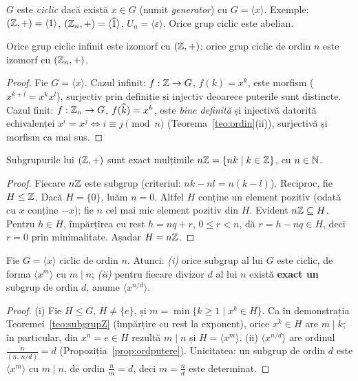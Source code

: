 \begin{definitie}
$G$ este \emph{ciclic} dacă există $x\in G$ (numit \emph{generator}) cu $G=\langle x\rangle$. Exemple: $(\mathbb{Z},+)=\langle 1\rangle$, $(\mathbb{Z}_n,+)=\langle\widehat{1}\rangle$, $U_n=\langle\varepsilon\rangle$. Orice grup ciclic este abelian.
\end{definitie}

\begin{teorema}\label{teo:clasif}
Orice grup ciclic infinit este izomorf cu $(\mathbb{Z},+)$; orice grup ciclic de ordin $n$ este izomorf cu $(\mathbb{Z}_n,+)$.
\end{teorema}

\begin{proof}
Fie $G=\langle x\rangle$. Cazul infinit: $f:\mathbb{Z}\to G$, $f(k)=x^k$, este morfism ($x^{k+l}=x^kx^l$), surjectiv prin definiție și injectiv deoarece puterile sunt distincte. Cazul finit: $f:\mathbb{Z}_n\to G$, $f(\widehat{k})=x^k$, este \emph{bine definită} și injectivă datorită echivalenței $x^i=x^j\iff i\equiv j\pmod n$ (Teorema~\ref{teo:ordin}(ii)), surjectivă și morfism ca mai sus.
\end{proof}

\begin{teorema}\label{teo:subgrupZ}
Subgrupurile lui $(\mathbb{Z},+)$ sunt exact mulțimile $n\mathbb{Z}=\{nk\mid k\in\mathbb{Z}\}$, cu $n\in\mathbb{N}$.
\end{teorema}

\begin{proof}
Fiecare $n\mathbb{Z}$ este subgrup (criteriul: $nk-nl=n(k-l)$). Reciproc, fie $H\le\mathbb{Z}$. Dacă $H=\{0\}$, luăm $n=0$. Altfel $H$ conține un element pozitiv (odată cu $x$ conține $-x$); fie $n$ cel mai mic element pozitiv din $H$. Evident $n\mathbb{Z}\subseteq H$. Pentru $h\in H$, împărțirea cu rest $h=nq+r$, $0\le r<n$, dă $r=h-nq\in H$, deci $r=0$ prin minimalitate. Așadar $H=n\mathbb{Z}$.
\end{proof}

\begin{teorema}\label{teo:subgrupciclic}
Fie $G=\langle x\rangle$ ciclic de ordin $n$. Atunci: \emph{(i)} orice subgrup al lui $G$ este ciclic, de forma $\langle x^m\rangle$ cu $m\mid n$; \emph{(ii)} pentru fiecare divizor $d$ al lui $n$ există \textbf{exact un} subgrup de ordin $d$, anume $\langle x^{n/d}\rangle$.
\end{teorema}

\begin{proof}
(i) Fie $H\le G$, $H\neq\{e\}$, și $m=\min\{k\ge 1\mid x^k\in H\}$. Ca în demonstrația Teoremei~\ref{teo:subgrupZ} (împărțire cu rest la exponent), orice $x^k\in H$ are $m\mid k$; în particular, din $x^n=e\in H$ rezultă $m\mid n$ și $H=\langle x^m\rangle$. (ii) $\langle x^{n/d}\rangle$ are ordinul $\frac{n}{(n,\,n/d)}=d$ (Propoziția~\ref{prop:ordputere}). Unicitatea: un subgrup de ordin $d$ este $\langle x^m\rangle$ cu $m\mid n$, de ordin $\frac{n}{m}=d$, deci $m=\frac{n}{d}$ este determinat.
\end{proof}

